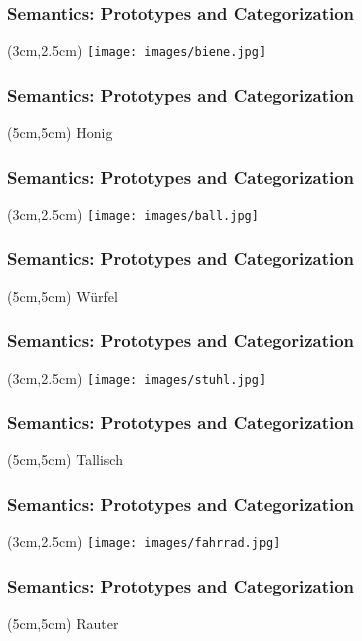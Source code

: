\documentclass[12pt, table]{beamer}
\begin{document}
\begin{frame}
\frametitle{Semantics: Prototypes and Categorization}
\begin{textblock*}{1cm}(3cm,2.5cm)
\texttt{[image: images/biene.jpg]}
\end{textblock*}
\end{frame}

\begin{frame}
\frametitle{Semantics: Prototypes and Categorization}
\begin{textblock*}{2cm}(5cm,5cm)
\large{Honig}
\end{textblock*}
\end{frame}

\begin{frame}
\frametitle{Semantics: Prototypes and Categorization}
\begin{textblock*}{1cm}(3cm,2.5cm)
\texttt{[image: images/ball.jpg]}
\end{textblock*}
\end{frame}

\begin{frame}
\frametitle{Semantics: Prototypes and Categorization}
\begin{textblock*}{2cm}(5cm,5cm)
\large{W{\"u}rfel}
\end{textblock*}
\end{frame}

\begin{frame}
\frametitle{Semantics: Prototypes and Categorization}
\begin{textblock*}{1cm}(3cm,2.5cm)
\texttt{[image: images/stuhl.jpg]}
\end{textblock*}
\end{frame}

\begin{frame}
\frametitle{Semantics: Prototypes and Categorization}
\begin{textblock*}{2cm}(5cm,5cm)
\large{Tallisch}
\end{textblock*}
\end{frame}

\begin{frame}
\frametitle{Semantics: Prototypes and Categorization}
\begin{textblock*}{1cm}(3cm,2.5cm)
\texttt{[image: images/fahrrad.jpg]}
\end{textblock*}
\end{frame}

\begin{frame}
\frametitle{Semantics: Prototypes and Categorization}
\begin{textblock*}{2cm}(5cm,5cm)
\large{Rauter}
\end{textblock*}
\end{frame}
\end{document}
